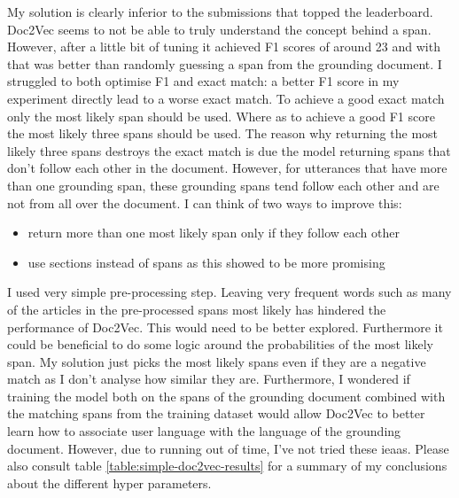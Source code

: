 \documentclass[11pt]{article}
\begin{document}
    My solution is clearly inferior to the submissions that topped the leaderboard. Doc2Vec seems to not be able
    to truly understand the concept behind a span. However, after a little bit
    of tuning it achieved F1 scores of around 23 and with that was better than randomly guessing a span from the grounding document.
    I struggled to both optimise F1 and exact match: a better F1 score in my experiment directly lead to a worse exact match.
    To achieve a good exact match
    only the most likely span should be used. Where as to achieve a good F1 score the most likely three spans should be used.
    The reason why returning the most likely three spans destroys the exact match is due the model returning spans that don't follow
    each other in the document. However, for utterances that have more than one grounding span,
    these grounding spans tend follow each other and are not from all over the document. I can think of two ways to improve this:
    \begin{itemize}
        \item return more than one most likely span only if they follow each other
        \item use sections instead of spans as this showed to be more promising
    \end{itemize}
    I used very simple pre-processing step. Leaving very frequent words such as many of the articles in the pre-processed
    spans most likely has hindered the performance of Doc2Vec. This would need to be better explored. Furthermore it
    could be beneficial to do some logic around the probabilities of the most likely span. My solution just picks the most
    likely spans even if they are a negative match as I don't analyse how similar they are. Furthermore, I wondered if
    training the model both on the spans of the grounding document combined with the matching spans from the training
    dataset would allow Doc2Vec to better learn how to associate user language with the language of the grounding document.
    However, due to running out of time, I've not tried these ieaas. Please also consult table \ref{table:simple-doc2vec-results} for
    a summary of my conclusions about the     different hyper parameters.\\
\end{document}
